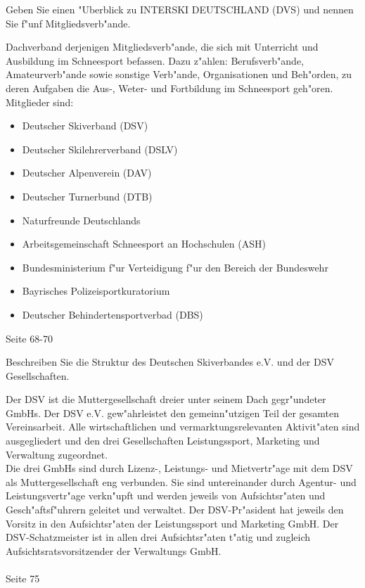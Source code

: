 \begin{question}{5}
Geben Sie einen "Uberblick zu INTERSKI DEUTSCHLAND (DVS) und nennen Sie f"unf Mitgliedsverb"ande.
\end{question}
\begin{solution}
Dachverband derjenigen  Mitgliedsverb"ande, die sich mit Unterricht und Ausbildung im Schneesport befassen. Dazu z"ahlen: Berufsverb"ande, Amateurverb"ande sowie sonstige Verb"ande, Organisationen und Beh"orden, zu deren Aufgaben die Aus-, Weter- und Fortbildung im Schneesport geh"oren. Mitglieder sind:
\begin{itemize}
\item Deutscher Skiverband (DSV)
\item Deutscher Skilehrerverband (DSLV)
\item Deutscher Alpenverein (DAV)
\item Deutscher Turnerbund (DTB)
\item Naturfreunde Deutschlands
\item Arbeitsgemeinschaft Schneesport an Hochschulen (ASH)
\item Bundesministerium f"ur Verteidigung f"ur den Bereich der Bundeswehr
\item Bayrisches Polizeisportkuratorium
\item Deutscher Behindertensportverbad (DBS)
\end{itemize}
 Seite 68-70
\end{solution}

\begin{question}{3}
Beschreiben Sie die Struktur des Deutschen Skiverbandes e.V. und der DSV Gesellschaften.
\end{question}
\begin{solution}
Der DSV ist die Muttergesellschaft dreier unter seinem Dach gegr"undeter GmbHs. Der DSV e.V. gew"ahrleistet den gemeinn"utzigen Teil der gesamten Vereinsarbeit. Alle wirtschaftlichen und vermarktungsrelevanten Aktivit"aten sind ausgegliedert und den drei Gesellschaften Leistungssport, Marketing und Verwaltung zugeordnet.\\
Die drei GmbHs sind durch Lizenz-, Leistungs- und Mietvertr"age mit dem DSV als Muttergesellschaft eng verbunden. Sie sind untereinander durch Agentur- und Leistungsvertr"age verkn"upft und werden jeweils von Aufsichtsr"aten und Gesch"aftsf"uhrern geleitet und verwaltet. Der DSV-Pr"asident hat jeweils den Vorsitz in den Aufsichtsr"aten der Leistungssport und Marketing GmbH. Der DSV-Schatzmeister ist in allen drei Aufsichtsr"aten t"atig und zugleich Aufsichtsratsvorsitzender der Verwaltungs GmbH.\\\\
 Seite 75
\end{solution}

